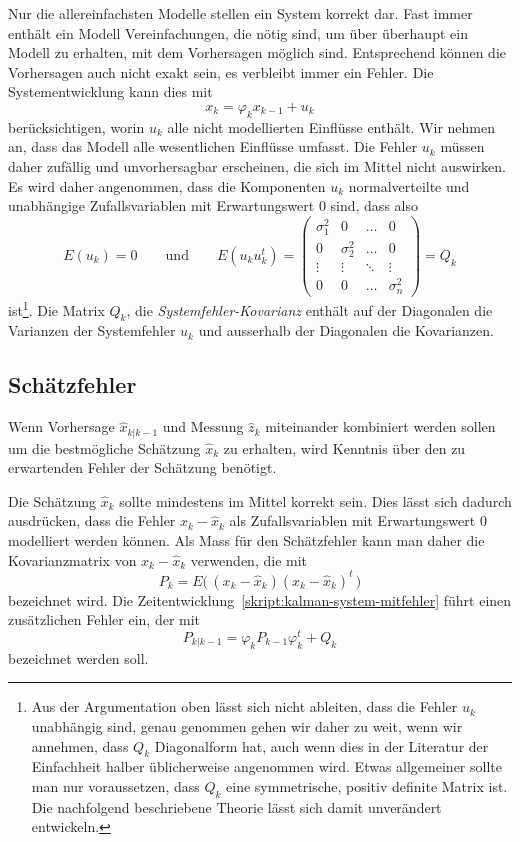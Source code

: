 Nur die allereinfachsten Modelle stellen ein System korrekt dar.
Fast immer enthält ein Modell Vereinfachungen, die nötig sind, um über
überhaupt ein Modell zu erhalten, mit dem Vorhersagen möglich sind.
Entsprechend können die Vorhersagen auch nicht exakt sein, es verbleibt
immer ein Fehler.
Die Systementwicklung kann dies mit
\begin{equation}
x_k = \varphi_k x_{k-1} + u_k
\label{skript:kalman-system-mitfehler}
\end{equation}
berücksichtigen, worin $u_k$ alle nicht modellierten Einflüsse
enthält. 
Wir nehmen an, dass das Modell alle wesentlichen Einflüsse umfasst.
Die Fehler $u_k$ müssen daher zufällig und unvorhersagbar erscheinen,
die sich im Mittel nicht auswirken.
Es wird daher angenommen, dass die Komponenten $u_k$ normalverteilte
und unabhängige Zufallsvariablen mit Erwartungswert $0$ sind, dass also
\[
E(u_k)=0
\qquad\text{und}\qquad
E(u_ku_k^t)
=
\begin{pmatrix}
\sigma_1^2&0         &\dots &0\\
0         &\sigma_2^2&\dots &0\\
\vdots    &\vdots    &\ddots&\vdots\\
0         &0         &\dots &\sigma_n^2
\end{pmatrix}
=
Q_k
\]
ist\footnote{%
Aus der Argumentation oben lässt sich nicht ableiten, dass
die Fehler $u_k$ unabhängig sind, genau genommen gehen wir daher zu
weit, wenn wir annehmen, dass $Q_k$ Diagonalform hat, auch wenn dies
in der Literatur der Einfachheit halber üblicherweise angenommen wird.
Etwas allgemeiner sollte man nur voraussetzen, dass $Q_k$ eine symmetrische,
positiv definite Matrix ist.
Die nachfolgend beschriebene Theorie lässt sich damit unverändert
entwickeln.
}.
Die Matrix $Q_k$, die {\em Systemfehler-Kovarianz}
enthält auf der Diagonalen die Varianzen der Systemfehler $u_k$ 
und ausserhalb der Diagonalen die Kovarianzen.

\subsection{Schätzfehler\label{subsection:schaetzfehler}}
Wenn Vorhersage $\hat{x}_{k|k-1}$ und Messung $\hat{z}_k$ 
miteinander kombiniert werden sollen um die bestmögliche Schätzung
$\hat{x}_k$ zu erhalten, wird Kenntnis über den zu erwartenden
Fehler der Schätzung benötigt.

Die Schätzung $\hat{x}_k$ sollte mindestens im Mittel korrekt sein.
Dies lässt sich dadurch ausdrücken, dass die Fehler $x_k - \hat{x}_k$
als Zufallsvariablen mit Erwartungswert $0$ modelliert werden können.
Als Mass für den Schätzfehler kann man daher die Kovarianzmatrix von
%
$x_k-\hat{x}_k$ verwenden, die mit
\[
P_k =  E\bigl(\, (x_k-\hat{x}_k) (x_k-\hat{x}_k)^t\,\bigr)
\]
bezeichnet wird.
Die Zeitentwicklung~\eqref{skript:kalman-system-mitfehler} führt einen
zusätzlichen Fehler ein, der mit
\begin{equation}
P_{k|k-1} = \varphi_k P_{k-1} \varphi_k^t + Q_k
\label{skript:kalman:fehlerentwicklung}
\end{equation}
bezeichnet werden soll.

